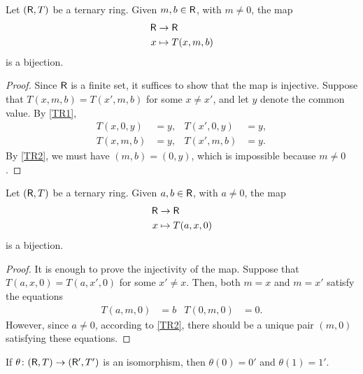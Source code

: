 \begin{lem}\label{lem:left-solution-of-sum}
    Let\/ $(\mathsf R,T)$ be a ternary ring. Given\/ $m,b\in\mathsf R$, with\/ $m\ne0$, the map
    \begin{align*}
        \mathsf R&\to\mathsf R\\
        x&\mapsto T(x,m,b)
    \end{align*}
    is a bijection.
\end{lem}

\begin{proof}
    Since $\mathsf R$ is a finite set, it suffices to show that the map is injective. Suppose that $T(x,m,b)=T(x',m,b)$ for some $x\ne x'$, and let $y$ denote the common value. By \textsc{\ref{TR1}},
    \begin{align*}
        T(x,0,y) &= y, &T(x',0,y) &= y,\\
        T(x,m,b) &= y, &T(x',m,b) &= y.
    \end{align*}
    By \textsc{\ref{TR2}}, we must have $(m,b)=(0,y)$, which is impossible because $m\ne0$.
\end{proof}

\begin{lem}\label{lem:right-solution-of-product}
    Let\/ $(\mathsf R,T)$ be a ternary ring. Given $a,b\in\mathsf R$, with $a\ne0$, the map
    \begin{align*}
        \mathsf R&\to\mathsf R\\
        x&\mapsto T(a,x,0)
    \end{align*}
    is a bijection.
\end{lem}

\begin{proof}
    It is enough to prove the injectivity of the map. Suppose that $T(a,x,0)=T(a,x',0)$ for some $x'\ne x$. Then, both $m=x$ and $m=x'$ satisfy the equations
    \begin{align*}
        T(a,m,0)&=b &T(0,m,0)&=0.
    \end{align*}
    However, since $a\ne0$, according to \textsc{\ref{TR2}}, there should be a unique pair $(m,0)$ satisfying these equations.
\end{proof}

\begin{lem}
    If\/ $\theta\colon(\mathsf R,T)\to(\mathsf R',T')$ is an isomorphism, then\/ $\theta(0)=0'$ and\/ $\theta(1)=1'$.
\end{lem}

